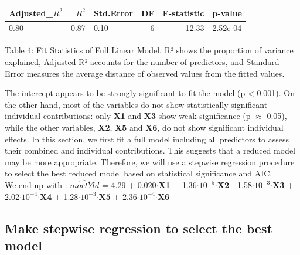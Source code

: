 \documentclass[
  12pt,
]{article}
\begin{document}
\noindent \vspace{-0.4em}

\begin{table}[!h]
\centering\begingroup\fontsize{8}{10}\selectfont

\begin{tabular}{lrlrrl}
\toprule
Adjusted\_$R^{2}$ & $R^2$ & Std.Error & DF & F-statistic & p-value\\
\midrule
0.80 & 0.87 & 0.10 & 6 & 12.33 & 2.52e-04\\
\bottomrule
\end{tabular}
\endgroup{}
\end{table}
\vspace{-1em}

\fontsize{12}{14}\selectfont Table 4: Fit Statistics of Full Linear
Model. R² shows the proportion of variance explained, Adjusted R²
accounts for the number of predictors, and Standard Error measures the
average distance of observed values from the fitted values.

\par

\addtocounter{table}{2}
\vspace{-2pt}

The intercept appears to be strongly significant to fit the model (p
\textless{} 0.001). On the other hand, most of the variables do not show
statistically significant individual contributions: only \textbf{X1} and
\textbf{X3} show weak significance (p \(\approx\) 0.05), while the other
variables, \textbf{X2}, \textbf{X5} and \textbf{X6}, do not show
significant individual effects. In this section, we first fit a full
model including all predictors to assess their combined and individual
contributions. This suggests that a reduced model may be more
appropriate. Therefore, we will use a stepwise regression procedure to
select the best reduced model based on statistical significance and
AIC.\\
We end up with : \(\hat{mortYld}\) = 4.29 + 0.020\(\cdot\)\textbf{X1} +
1.36\(\cdot\)\(10^{-5}\)\(\cdot\)\textbf{X2} -
1.58\(\cdot\)\(10^{-3}\)\(\cdot\)\textbf{X3} +
2.02\(\cdot\)\(10^{-4}\)\(\cdot\)\textbf{X4} +
1.28\(\cdot\)\(10^{-3}\)\(\cdot\)\textbf{X5} +
2.36\(\cdot\)\(10^{-4}\)\(\cdot\)\textbf{X6} \vspace{-1em}

\subsection{Make stepwise regression to select the best
model}\label{make-stepwise-regression-to-select-the-best-model}
\end{document}
